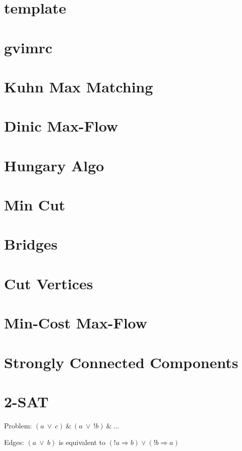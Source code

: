\documentclass[10pt]{article}
\begin{document}
\section{template}

\section{gvimrc}


\section{Kuhn Max Matching}

\section{Dinic Max-Flow}

\section{Hungary Algo}

\section{Min Cut}

\section{Bridges}

\section{Cut Vertices}

\section{Min-Cost Max-Flow}

\section{Strongly Connected Components}


\section{2-SAT}
Problem: $(a ~ \vee ~ c) ~ \& ~ (a ~ \vee ~ !b) ~\& ~\ldots$

Edges: $(a ~ \vee ~ b)$ is equivalent to $(!a \Rightarrow b) \vee (!b \Rightarrow a)$
\end{document}
